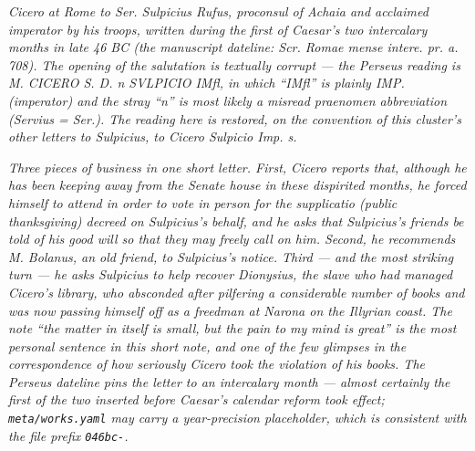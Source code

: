 
\textit{Cicero at Rome to Ser. Sulpicius Rufus, proconsul of
Achaia and acclaimed \textit{imperator} by his troops, written
during the first of Caesar's two intercalary months in late 46 BC
(the manuscript dateline: \textit{Scr. Romae mense intere. pr. a.
708}). The opening of the salutation is textually corrupt --- the
Perseus reading is \textit{M. CICERO S. D. n SVLPICIO IMfl}, in
which ``IMfl'' is plainly \textit{IMP.} (imperator) and the stray
``n'' is most likely a misread praenomen abbreviation (Servius =
\textit{Ser.}). The reading here is restored, on the convention
of this cluster's other letters to Sulpicius, to \textit{Cicero
Sulpicio Imp. s.}}

\textit{Three pieces of business in one short letter. First,
Cicero reports that, although he has been keeping away from the
Senate house in these dispirited months, he forced himself to
attend in order to vote in person for the \textit{supplicatio}
(public thanksgiving) decreed on Sulpicius's behalf, and he asks
that Sulpicius's friends be told of his good will so that they
may freely call on him. Second, he recommends M. Bolanus, an old
friend, to Sulpicius's notice. Third --- and the most striking
turn --- he asks Sulpicius to help recover Dionysius, the slave
who had managed Cicero's library, who absconded after pilfering a
considerable number of books and was now passing himself off as
a freedman at Narona on the Illyrian coast. The note ``the matter
in itself is small, but the pain to my mind is great'' is the
most personal sentence in this short note, and one of the few
glimpses in the correspondence of how seriously Cicero took the
violation of his books. The Perseus dateline pins the letter to
an intercalary month --- almost certainly the first of the two
inserted before Caesar's calendar reform took effect; \texttt{meta/works.yaml}
may carry a year-precision placeholder, which is consistent with
the file prefix \texttt{046bc-}.}
